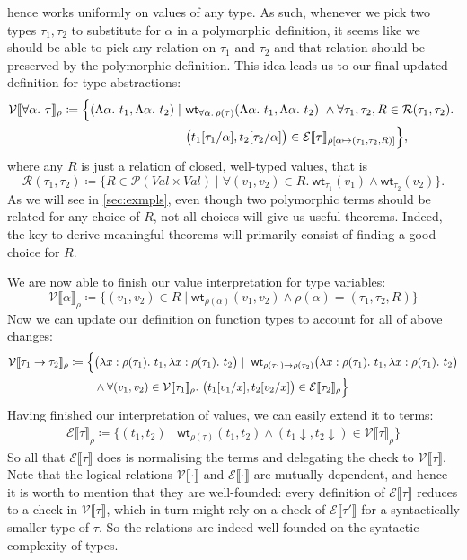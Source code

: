 \documentclass[12pt]{article}
\theoremstyle{plain}
\theoremstyle{definition}
\newcommand{\denot}[1]{\llbracket#1\rrbracket}
\newcommand{\vint}[1]{\mathcal{V}\denot{#1}}
\newcommand{\tint}[1]{\mathcal{E}\denot{#1}}
\newcommand{\wt}[1]{\mathsf{wt}_{#1}}
\newcommand{\rels}{\mathcal{R}}
\newcommand{\values}{Val}
\newcommand{\nf}[1]{#1{\downarrow}}
\begin{document}
hence works uniformly on values of any type.
As such,
whenever we pick two types $\tau_1,\tau_2$ to substitute for $\alpha$ in a polymorphic definition,
it seems like we should be able to pick any relation on $\tau_1$ and $\tau_2$ and
that relation should be preserved by the polymorphic definition.
This idea leads us to our final updated definition for type abstractions:
\begin{align*}
  \vint{\forall \alpha.\ \tau}_\rho\coloneqq
  \Bigl\{(\Lambda \alpha.\ t_1, \Lambda \alpha.\ t_2) \mid\
  &\wt{\forall \alpha.\, \rho(\tau)}(\Lambda \alpha.\ t_1, \Lambda \alpha.\ t_2)\ \land
  \forall \tau_1,\tau_2,R\in\rels(\tau_1,\tau_2).\ \\
  &\bigl(t_1[\tau_1/\alpha],t_2[\tau_2/\alpha]\bigr)\in\tint{\tau}_{\rho[\alpha\mapsto(\tau_1,\tau_2,R)]} \Bigr\},
\end{align*}
where any $R$ is just a relation of closed, well-typed values, that is
\begin{equation*}
\rels(\tau_1,\tau_2)\coloneqq\bigl\{R\in\mathcal{P}(\values\times \values)\mid \forall(v_1,v_2)\in R.\ \wt{\tau_1}(v_1)\land\wt{\tau_2}(v_2)\bigr\}.
\end{equation*}
As we will see in \cref{sec:exmpls},
even though two polymorphic terms should be related for any choice of $R$,
not all choices will give us useful theorems.
Indeed, the key to derive meaningful theorems will primarily consist of finding a
good choice for $R$.

We are now able to finish our value interpretation for type variables:
\begin{equation*}
  \vint{\alpha}_\rho\coloneqq
  \bigl\{(v_1,v_2) \in R \mid
  \wt{\rho(\alpha)}(v_1,v_2) \land \rho(\alpha)=(\tau_1,\tau_2,R) \bigr\}
\end{equation*}
Now we can update our definition on function types to account for all of above changes:
\begin{align*}
  \vint{\tau_1\to\tau_2}_\rho\coloneqq
  \Bigl\{&\bigl(\lambda x : \rho(\tau_1).\ t_1, \lambda x : \rho(\tau_1).\ t_2\bigr) \mid\
  \wt{\rho(\tau_1)\to\rho(\tau_2)}\bigl(\lambda x : \rho(\tau_1).\ t_1, \lambda x : \rho(\tau_1).\ t_2\bigr)\\
  & \land \forall (v_1,v_2)\in\vint{\tau_1}_\rho.\ \bigl(t_1[v_1/x],t_2[v_2/x]\bigr)\in\tint{\tau_2}_\rho \Bigr\}
\end{align*}
Having finished our interpretation of values, we can easily extend it to terms:
\begin{align*}
  \tint{\tau}_\rho\coloneqq\bigl\{(t_1,t_2)\mid
  \wt{\rho(\tau)}(t_1,t_2)\land (\nf{t_1},\nf{t_2})\in\vint{\tau}_\rho\bigr\}
\end{align*}
So all that $\tint{\tau}$ does is normalising the terms and delegating the check to $\vint{\tau}$.
Note that the logical relations $\vint{\cdot}$ and $\tint{\cdot}$ are
mutually dependent, and hence it is worth to mention
that they are well-founded:
every definition of $\tint{\tau}$ reduces to a check in $\vint{\tau}$,
which in turn might rely on a check of $\tint{\tau'}$ for a syntactically
smaller type of $\tau$.
So the relations are indeed well-founded on the syntactic complexity of types.
\end{document}
